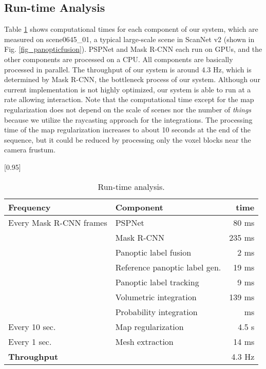 \documentclass[letterpaper, 10pt, conference]{latex_template/ieeeconf}
\begin{document}
\subsection{Run-time Analysis}
Table \ref{table_runtime_analysis} shows computational times for each component of our system, which are measured on scene0645\_01, a typical large-scale scene in ScanNet v2 (shown in Fig. \ref{fig_panopticfusion}).
PSPNet and Mask R-CNN each run on GPUs, and the other components are processed on a CPU.
All components are basically processed in parallel. The throughput of our system is around 4.3 Hz, which is determined by Mask R-CNN, the bottleneck process of our system.
Although our current implementation is not highly optimized, our system is able to run at a rate allowing interaction.
Note that the computational time except for the map regularization does not depend on the scale of scenes nor the number of {\it things} because we utilize the raycasting approach for the integrations.
The processing time of the map regularization increases to about 10 seconds at the end of the sequence, but it could be reduced by processing only the voxel blocks near the camera frustum.

\begin{table}[t]
   \renewcommand{\baselinestretch}{0.8}
   \caption{Run-time analysis.}
   \label{table_runtime_analysis}
   \centering
   \scalebox{0.95}[0.95]{
      \begin{tabular}{llr}
         \hline
         \textbf{Frequency} & \textbf{Component} & \textbf{time} \\ \hline
         Every Mask R-CNN frames & PSPNet & 80 ms \\
          & Mask R-CNN & 235 ms \\
          & Panoptic label fusion & 2 ms \\ \cline{2-3} 
          & Reference panoptic label gen. & 19  ms \\
          & Panoptic label tracking & 9  ms \\
          & Volumetric integration & 139  ms \\
          & Probability integration &   ms \\ \hline
         Every 10 sec. & Map regularization & 4.5 s \\ \hline
         Every 1 sec. & Mesh extraction & 14 ms \\ \hline \hline
         \textbf{Throughput} &  & 4.3 Hz \\ \hline
      \end{tabular}
   }
\end{table}
\end{document}
